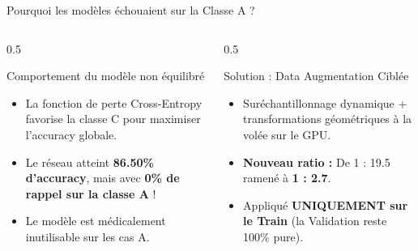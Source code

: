 \documentclass[10pt, compress]{beamer}
\begin{document}
\begin{frame}{Pourquoi les modèles échouaient sur la Classe A ?}
    \begin{columns}
        \begin{column}{0.5\textwidth}
            \begin{block}{Comportement du modèle non équilibré}
                \begin{itemize}
                    \item La fonction de perte Cross-Entropy favorise la classe C pour maximiser l'accuracy globale.
                    \item Le réseau atteint \textbf{86.50\% d'accuracy}, mais avec \textbf{0\% de rappel sur la classe A} !
                    \item Le modèle est médicalement inutilisable sur les cas A.
                \end{itemize}
            \end{block}
        \end{column}
        \begin{column}{0.5\textwidth}
            \begin{block}{Solution : Data Augmentation Ciblée}
                \begin{itemize}
                    \item Suréchantillonnage dynamique + transformations géométriques à la volée sur le GPU.
                    \item \textbf{Nouveau ratio :} De 1 : 19.5 ramené à \textbf{1 : 2.7}.
                    \item Appliqué \textbf{UNIQUEMENT sur le Train} (la Validation reste 100\% pure).
                \end{itemize}
            \end{block}
        \end{column}
    \end{columns}
\end{frame}
\end{document}
